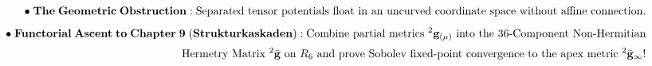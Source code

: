\documentclass[preview]{standalone}
\begin{document}
\begin{align*}
\special{dvisvgm:raw <g id='unique000'>}\bullet\;\mathbf{The\;Geometric\;Obstruction:}\;\text{Separated tensor potentials float in an uncurved coordinate space without affine connection.}\\[4pt]\bullet\;\mathbf{Functorial\;Ascent\;to\;Chapter\;9\;(Strukturkaskaden):}\;\text{Combine partial metrics }{}^2\mathbf{g}_{(\mu)}\text{ into the 36-Component Non-Hermitian}\\[2pt]\;\;\text{Hermetry Matrix }{}^2\bar{\mathbf{g}}\text{ on }R_6\text{ and prove Sobolev fixed-point convergence to the apex metric }{}^2\bar{\mathbf{g}}_\infty!\special{dvisvgm:raw </g>}
\end{align*}
\end{document}
